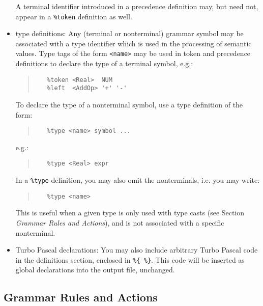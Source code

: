 \documentclass{article}
\begin{document}
\begin{itemize}
      A terminal identifier introduced in a precedence definition may, but
      need not, appear in a \verb"%token" definition as well.
   \item
      type definitions: Any (terminal or nonterminal) grammar symbol may be
      associated with a type identifier which is used in the processing of
      semantic values. Type tags of the form \verb"<name>" may be used in
      token and precedence definitions to declare the type of a terminal
      symbol, e.g.:
      \begin{quote}\begin{verbatim}
   %token <Real>  NUM
   %left  <AddOp> '+' '-'
      \end{verbatim}\end{quote}

      To declare the type of a nonterminal symbol, use a type definition of
      the form:
      \begin{quote}\begin{verbatim}
   %type <name> symbol ...
      \end{verbatim}\end{quote}
      e.g.:
      \begin{quote}\begin{verbatim}
   %type <Real> expr
      \end{verbatim}\end{quote}

      In a \verb"%type" definition, you may also omit the nonterminals, i.e.
      you may write:
      \begin{quote}\begin{verbatim}
   %type <name>
      \end{verbatim}\end{quote}

      This is useful when a given type is only used with type casts (see
      Section {\em Grammar Rules and Actions\/}), and is not associated with
      a specific nonterminal.
   \item
      Turbo Pascal declarations: You may also include arbitrary Turbo Pascal
      code in the definitions section, enclosed in \verb"%{ %}". This code
      will be inserted as global declarations into the output file, unchanged.
\end{itemize}

\subsection{Grammar Rules and Actions}
\end{document}
